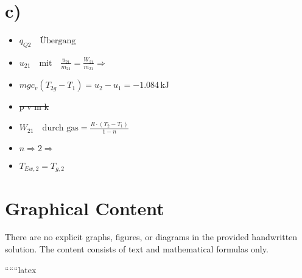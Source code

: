 

\section*{c)}
\begin{itemize}
    \item $q_{Q2} \quad \text{Übergang}$
    \item $u_{21} \quad \text{mit} \quad \frac{u_{21}}{m_{21}} = \frac{W_{21}}{m_{21}} \Rightarrow$
    \item $m g c_v (T_{2g} - T_1) = u_2 - u_1 = -1.084 \, \text{kJ}$
    \item \sout{p \cdot v \cdot m \cdot k}
    \item $W_{21} \quad \text{durch gas} = \frac{R \cdot (T_2 - T_1)}{1 - n}$
    \item $n \Rightarrow 2 \Rightarrow$
    \item $T_{Ew,2} = T_{g,2}$
\end{itemize}

\section*{Graphical Content}
There are no explicit graphs, figures, or diagrams in the provided handwritten solution. The content consists of text and mathematical formulas only.

``````latex